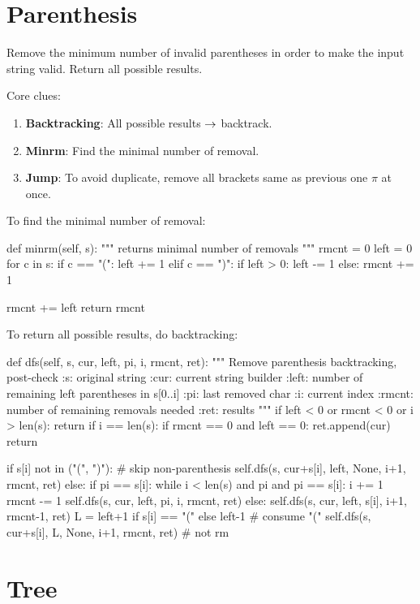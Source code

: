 \section{Parenthesis}
 Remove the minimum number of invalid parentheses in order to make the input string valid. Return all possible results.

Core clues:
\begin{enumerate}
\item \textbf{Backtracking}: All possible results $\rightarrow$ backtrack. 
\item \textbf{Minrm}: Find the minimal number of removal.
\item \textbf{Jump}: To avoid duplicate, remove all brackets same as previous one $\pi$ at once.
\end{enumerate}

To find the minimal number of removal:
\begin{python}
def minrm(self, s):
    """
    returns minimal number of removals
    """
    rmcnt = 0
    left = 0
    for c in s:
        if c == "(":
            left += 1
        elif c == ")":
            if left > 0:
                left -= 1
            else:
                rmcnt += 1

    rmcnt += left
    return rmcnt
\end{python}
To return all possible results, do backtracking: 
\begin{python}
def dfs(self, s, cur, left, pi, i, rmcnt, ret):
  """
  Remove parenthesis
  backtracking, post-check
  :s: original string
  :cur: current string builder
  :left: number of remaining left parentheses in s[0..i]
  :pi: last removed char
  :i: current index
  :rmcnt: number of remaining removals needed
  :ret: results
  """
  if left < 0 or rmcnt < 0 or i > len(s):
    return
  if i == len(s):
    if rmcnt == 0 and left == 0:
      ret.append(cur)
    return

  if s[i] not in ("(", ")"):  # skip non-parenthesis
    self.dfs(s, cur+s[i], left, None, i+1, rmcnt, ret)
  else:
    if pi == s[i]:
      while i < len(s) and pi and pi == s[i]: 
        i += 1
        rmcnt -= 1
      self.dfs(s, cur, left, pi, i, rmcnt, ret)
    else:
      self.dfs(s, cur, left, s[i], i+1, rmcnt-1, ret)
      L = left+1 if s[i] == "(" else left-1  # consume "("
      self.dfs(s, cur+s[i], L, None, i+1, rmcnt, ret)  # not rm
\end{python}
\section{Tree}
